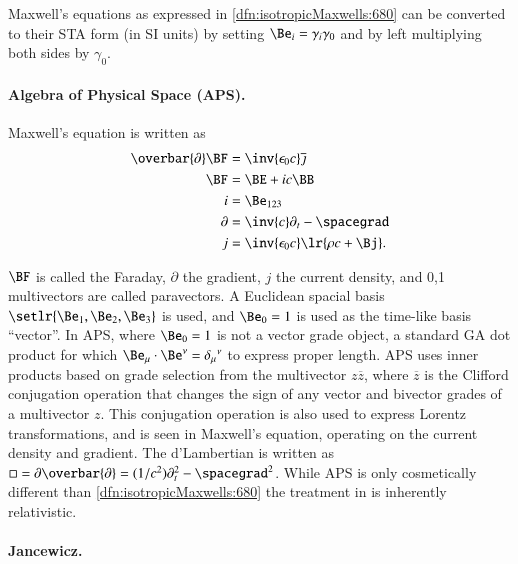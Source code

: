 Maxwell's equations as expressed in \cref{dfn:isotropicMaxwells:680} can be converted to their STA form (in SI units) by setting \( \Be_i = \gamma_i \gamma_0 \) and by left multiplying both sides by \( \gamma_0 \).

\paragraph{Algebra of Physical Space (APS).  \citep{baylis2004electrodynamics}}
Maxwell's equation is written as
\begin{dmath}\label{eqn:galiterature:40}
\begin{aligned}
\overbar{\partial} \BF &= \inv{\epsilon_0 c} \overline{\jmath} \\
\BF &= \BE + i c \BB \\
i &= \Be_{123} \\
\partial &= \inv{c} \partial_t - \spacegrad \\
j &= \inv{\epsilon_0 c} \lr{ \rho c + \Bj }.
\end{aligned}
\end{dmath}

\( \BF \) is called the Faraday, \( \partial \) the gradient, \( j \) the current density, and
0,1 multivectors are called paravectors.
A Euclidean spacial basis \( \setlr{ \Be_1, \Be_2, \Be_3 } \) is used, and \( \Be_0 = 1 \) is used as the time-like basis ``vector''.
In APS, where \( \Be_0 = 1 \) is not a vector grade object, a standard GA dot product for which \( \Be_\mu \cdot \Be^\nu = {\delta_\mu}^\nu \)
to express proper length.
APS uses inner products based on grade selection from the multivector \( z \overbar{z} \), where
\( \overbar{z} \) is the Clifford conjugation operation
that changes the sign of any vector and bivector grades of a multivector \( z \).
This conjugation operation is also used to express Lorentz transformations, and is seen in Maxwell's equation, operating on the current density and gradient.
The d'Lambertian is written as \( \Box = \partial \overbar{\partial} = (1/c^2) \partial_t^2 - \spacegrad^2 \).
While APS is only cosmetically different than \cref{dfn:isotropicMaxwells:680} the treatment in \citep{baylis2004electrodynamics} is inherently relativistic.

\paragraph{Jancewicz.  \citep{jancewicz1988multivectors}}

